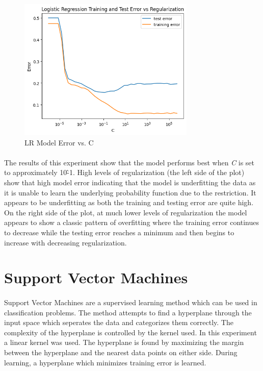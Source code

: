 \documentclass[12pt, letterpaper]{article}
\begin{document}
\begin{figure}[ht]
    \centering
    \includegraphics[width=0.75\textwidth]{2.png}
    \caption{LR Model Error vs. C}
    \label{fig:4}
\end{figure}

\paragraph*{}The results of this experiment show that the model performs best
when \textit{C} is set to approximately 10\^-1. High levels of regularization (the
left side of the plot) show that high model error indicating that the model is
underfitting the data as it is unable to learn the underlying probability function
due to the restriction. It appears to be underfitting as both the training
and testing error are quite high. On the right side of the plot, at much lower levels
of regularization the model appears to show a classic pattern of overfitting
where the training error continues to decrease while the testing error reaches
a minimum and then begins to increase with decreasing regularization.

\section{Support Vector Machines}

\paragraph*{}Support Vector Machines are a supervised learning method which can
be used in classification problems. The method attempts to find a hyperplane 
through the input space which seperates the data and categorizes them correctly.
The complexity of the hyperplane is controlled by the kernel used. In this experiment
a linear kernel was used. The hyperplane is found by maximizing the margin between
the hyperplane and the nearest data points on either side. During learning, a hyperplane
which minimizes training error is learned.
\end{document}
